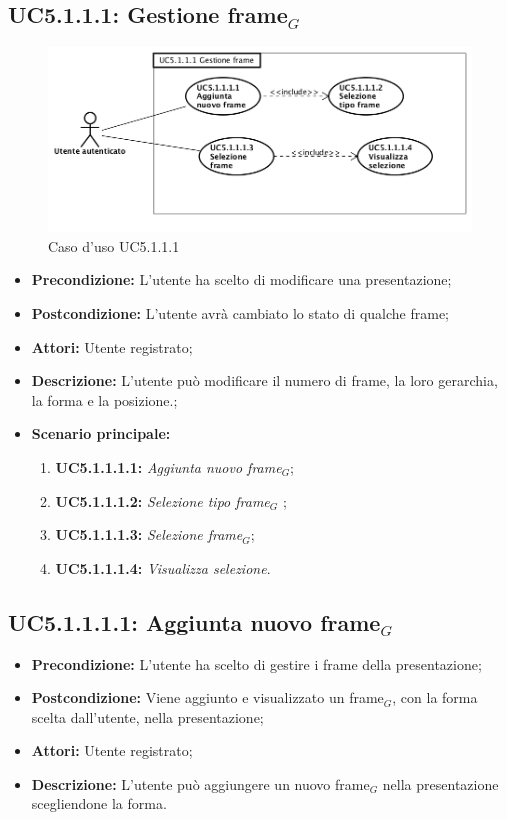 \subsection{ UC5.1.1.1: Gestione frame$_G$}

\begin{figure}[h]
	\begin{center}
	\includegraphics[scale=0.5]{diagram/UC5-1-1-1.png}
	\caption{Caso d'uso UC5.1.1.1}
	\end{center}
\end{figure}
\begin{itemize}
	\item \textbf{Precondizione:} L'utente ha scelto di modificare una presentazione;
	\item \textbf{Postcondizione:} L'utente avrà cambiato lo stato di qualche frame;
	\item \textbf{Attori:} Utente registrato;
	\item \textbf{Descrizione:} L'utente può modificare il numero di frame, la loro gerarchia, la forma e la posizione.;
	\item \textbf{Scenario principale:}
	\begin{enumerate}
		\item \textbf{ UC5.1.1.1.1:} \textit{ Aggiunta nuovo frame$_G$};
		\item \textbf{ UC5.1.1.1.2:} \textit{ Selezione tipo frame$_G$ };
		\item \textbf{ UC5.1.1.1.3:} \textit{ Selezione frame$_G$};
		\item \textbf{ UC5.1.1.1.4:} \textit{ Visualizza selezione}.
	\end{enumerate}
\end{itemize}
\subsection{ UC5.1.1.1.1: Aggiunta nuovo frame$_G$}

\begin{itemize}
	\item \textbf{Precondizione:} L'utente ha scelto di gestire i frame della presentazione;
	\item \textbf{Postcondizione:} Viene aggiunto e visualizzato un frame$_G$, con la forma scelta dall'utente, nella presentazione;
	\item \textbf{Attori:} Utente registrato;
	\item \textbf{Descrizione:} L'utente può aggiungere un nuovo frame$_G$ nella presentazione scegliendone la forma.
\end{itemize}
